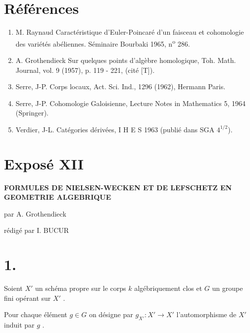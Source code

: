 \documentclass[11pt]{article}
\providecommand{\EP}{\operatorname{EP}}
\providecommand{\Ob}{\operatorname{ob}}
\providecommand{\Ob}{\operatorname{ob}}
\providecommand{\EP}{\operatorname{EP}}
\providecommand{\Ob}{\operatorname{Ob}}
\providecommand{\Ob}{\operatorname{ob}}
\providecommand{\Ob}{\operatorname{Ob}}
\begin{document}
\section*{Références}

\begin{enumerate}
\item[{[1]}] M.
Raynaud Caractéristique d'Euler-Poincaré d'un faisceau et cohomologie des variétés abéliennes. Séminaire Bourbaki 1965, n\textsuperscript{o} 286.
\item[{[2]}] A. Grothendieck Sur quelques points d'algèbre homologique, Toh. Math. Journal, vol. 9 (1957), p. 119 - 221, (cité [T]).
\item[{[3]}] Serre, J-P. Corps locaux, Act. Sci. Ind., 1296 (1962), Hermann Paris.
\item[{[4]}] Serre, J-P. Cohomologie Galoisienne, Lecture Notes in Mathematics 5, 1964 (Springer).
\item[{[5]}] Verdier, J-L. Catégories dérivées, I H E S 1963 (publié dans SGA $4^{1/2}$).
\end{enumerate}

\renewcommand{\EP}{\operatorname{EP}}
\renewcommand{\Ob}{\operatorname{ob}}
\section*{Exposé XII}

\begin{center}
\Large\bf
FORMULES DE NIELSEN-WECKEN ET DE LEFSCHETZ EN GEOMETRIE ALGEBRIQUE
\end{center}

\begin{center}
par A. Grothendieck

rédigé par I. BUCUR
\end{center}

\bigskip

\section*{1.}
Soient $X'$ un schéma propre sur le corps $k$ algébriquement clos et $G$ un groupe fini opérant sur $X'$ .

Pour chaque élément $g \in G$ on désigne par $g_{X'} : X' \to X'$ l'automorphisme de $X'$ induit par $g$ .
\end{document}
